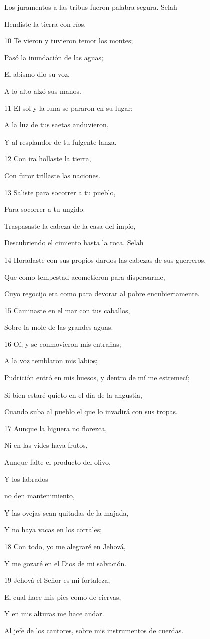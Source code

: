 \par Los juramentos a las tribus fueron palabra segura. Selah
\par Hendiste la tierra con ríos.
\par 10 Te vieron y tuvieron temor los montes;
\par Pasó la inundación de las aguas;
\par El abismo dio su voz,
\par A lo alto alzó sus manos.
\par 11 El sol y la luna se pararon en su lugar;
\par A la luz de tus saetas anduvieron,
\par Y al resplandor de tu fulgente lanza.
\par 12 Con ira hollaste la tierra,
\par Con furor trillaste las naciones.
\par 13 Saliste para socorrer a tu pueblo,
\par Para socorrer a tu ungido.
\par Traspasaste la cabeza de la casa del impío,
\par Descubriendo el cimiento hasta la roca. Selah
\par 14 Horadaste con sus propios dardos las cabezas de sus guerreros,
\par Que como tempestad acometieron para dispersarme,
\par Cuyo regocijo era como para devorar al pobre encubiertamente.
\par 15 Caminaste en el mar con tus caballos,
\par Sobre la mole de las grandes aguas.
\par 16 Oí, y se conmovieron mis entrañas;
\par A la voz temblaron mis labios;
\par Pudrición entró en mis huesos, y dentro de mí me estremecí; 
\par Si bien estaré quieto en el día de la angustia,
\par Cuando suba al pueblo el que lo invadirá con sus tropas.
\par 17 Aunque la higuera no florezca,
\par Ni en las vides haya frutos,
\par Aunque falte el producto del olivo,
\par Y los labrados
\par no den mantenimiento,
\par Y las ovejas sean quitadas de la majada,
\par Y no haya vacas en los corrales;
\par 18 Con todo, yo me alegraré en Jehová,
\par Y me gozaré en el Dios de mi salvación.
\par 19 Jehová el Señor es mi fortaleza,
\par El cual hace mis pies como de ciervas, 
\par Y en mis alturas me hace andar. 
\par Al jefe de los cantores, sobre mis instrumentos de cuerdas.

